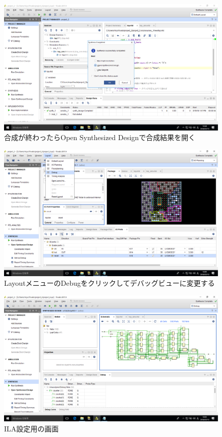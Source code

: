 \documentclass[a4paper,dvipdfmx]{jsarticle}
\begin{document}
 \begin{figure}[H]
  \begin{center}
   \includegraphics[width=.8\textwidth]{chapter05_figures/VirtualBox_Windows10_19_03_2018_13_58_37.png}
  \end{center}
  \caption{合成が終わったらOpen Synthesized Designで合成結果を開く}
 \end{figure}

 \begin{figure}[H]
  \begin{center}
   \includegraphics[width=.8\textwidth]{chapter05_figures/VirtualBox_Windows10_19_03_2018_14_00_09.png}
  \end{center}
  \caption{LayoutメニューのDebugをクリックしてデバッグビューに変更する}
 \end{figure}

 \begin{figure}[H]
  \begin{center}
   \includegraphics[width=.8\textwidth]{chapter05_figures/VirtualBox_Windows10_19_03_2018_14_03_37.png}
  \end{center}
  \caption{ILA設定用の画面 \label{fig:debug_mode_view}}
 \end{figure}
\end{document}
